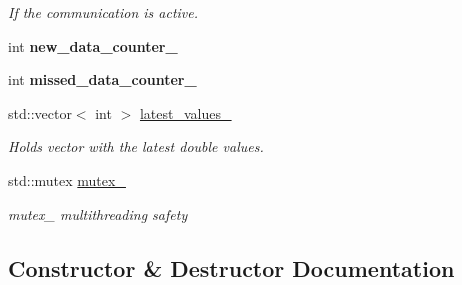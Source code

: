 \begin{DoxyCompactItemize}
\begin{DoxyCompactList}\small\item\em If the communication is active. \end{DoxyCompactList}\item 
int {\bfseries new\+\_\+data\+\_\+counter\+\_\+}\hypertarget{classblmc__drivers_1_1SerialReader_a862829c3e7f3c59b1e3be49b61e6cfb5}{}\label{classblmc__drivers_1_1SerialReader_a862829c3e7f3c59b1e3be49b61e6cfb5}

\item 
int {\bfseries missed\+\_\+data\+\_\+counter\+\_\+}\hypertarget{classblmc__drivers_1_1SerialReader_a516bbec3112f46bb6442858d2d9446bf}{}\label{classblmc__drivers_1_1SerialReader_a516bbec3112f46bb6442858d2d9446bf}

\item 
std\+::vector$<$ int $>$ \hyperlink{classblmc__drivers_1_1SerialReader_ac6f46fc37c9ce41908ad76b012d2160b}{latest\+\_\+values\+\_\+}\hypertarget{classblmc__drivers_1_1SerialReader_ac6f46fc37c9ce41908ad76b012d2160b}{}\label{classblmc__drivers_1_1SerialReader_ac6f46fc37c9ce41908ad76b012d2160b}

\begin{DoxyCompactList}\small\item\em Holds vector with the latest double values. \end{DoxyCompactList}\item 
std\+::mutex \hyperlink{classblmc__drivers_1_1SerialReader_a38d2ba095d199db4ae9858b888ef20de}{mutex\+\_\+}\hypertarget{classblmc__drivers_1_1SerialReader_a38d2ba095d199db4ae9858b888ef20de}{}\label{classblmc__drivers_1_1SerialReader_a38d2ba095d199db4ae9858b888ef20de}

\begin{DoxyCompactList}\small\item\em mutex\+\_\+ multithreading safety \end{DoxyCompactList}\end{DoxyCompactItemize}


\subsection{Constructor \& Destructor Documentation}
